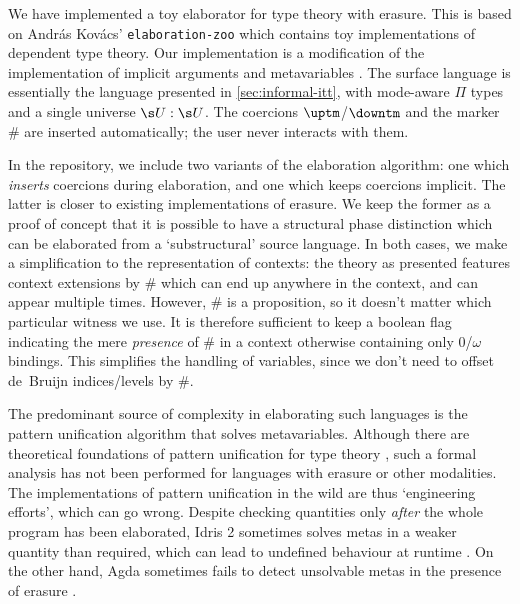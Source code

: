 We have implemented a toy elaborator for type theory
with erasure. This is based on Andr\'as Kov\'acs' \texttt{elaboration-zoo} which
contains toy implementations of dependent type theory. Our implementation is a
modification of the implementation of implicit arguments and metavariables
\cite{KovacsUnknown-sx}. The surface language is essentially the
language presented in \cref{sec:informal-itt}, with mode-aware $\Pi$ types and a
single universe $\s U : \s U$. The coercions $\uptm$/$\downtm$ and the marker
$\#$ are inserted automatically; the user never interacts with them.

In the repository, we include two variants of the elaboration algorithm: one
which \emph{inserts} coercions during elaboration, and one which keeps coercions
implicit. The latter is closer to existing implementations of
erasure. We keep the former as a proof of concept that it is possible to have a
structural phase distinction which can be elaborated from a `substructural'
source language. In both cases, we make a simplification to the representation
of contexts: the theory \ZTT as presented features context extensions by $\#$
which can end up anywhere in the context, and can appear multiple times.
However, $\#$ is a proposition, so it doesn't matter which particular witness we
use. It is therefore sufficient to keep a boolean flag indicating the mere
\emph{presence} of $\#$ in a context otherwise containing only 0/$\omega$
bindings. This simplifies the handling of variables, since we don't need to
offset de~Bruijn indices/levels by $\#$.

The predominant source of complexity in elaborating such languages is the
pattern unification algorithm that solves metavariables. Although there are
theoretical foundations of pattern unification for type theory
\cite{Abel2011-sx}, such a formal analysis has not been performed for languages
with erasure or other modalities. The implementations of pattern unification in
the wild are thus `engineering efforts', which can go wrong. Despite checking
quantities only \emph{after} the whole program has been elaborated, Idris 2
sometimes solves metas in a weaker quantity than required, which can lead to
undefined behaviour at runtime \cite{Dunham2024-up}. On the other hand, Agda
sometimes fails to detect unsolvable metas in the presence of erasure
\cite{Cockx2021-mq}. 

